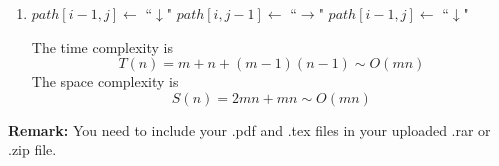 \documentclass[12pt,a4paper]{article}
\makeatletter
\newtheorem*{solution}{Solution}
\theoremstyle{definition}
\renewenvironment{solution}[1][Solution] {\par\pushQED{\qed}\normalfont\topsep6\p@\@plus6\p@\relax\trivlist\item[\hskip\labelsep\bfseries#1\@addpunct{.}]\ignorespaces}{\popQED\endtrivlist\@endpefalse} \makeatother
\makeatother
\begin{document}
\begin{enumerate}
\begin{solution}
\begin{algorithm}[H]
{{{         					{
         						$path[i-1, j] \leftarrow$ ``$\downarrow$"\; 
         					}
         					\Else
         					{
         						$path[i, j-1] \leftarrow$ ``$\rightarrow$"\; 
         						$path[i-1, j] \leftarrow$ ``$\downarrow$"\; 
         					}
         				}
        	 		}
        	 	}
         		{
         		}
         		\Else
         		{
         			\;
         		}
        	 \end{algorithm}
         	The time complexity is 
         	\[
         	T(n) = m + n + (m-1)(n-1) \sim O(mn)
         	\]
         	The space complexity is 
         	\[
         	S(n) = 2mn + mn \sim O(mn)
         	\]
	    \end{solution}

\end{enumerate}

\vspace{20pt}

\textbf{Remark:} You need to include your .pdf and .tex files in your uploaded .rar or .zip file.

\end{document}

